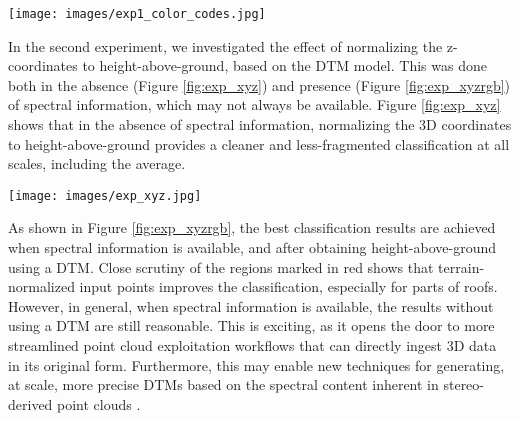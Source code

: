 \documentclass[final,3p,times,twocolumn,authoryear]{elsarticle}
\begin{document}
\begin{figure*}[th]
\begin{center}
\texttt{[image: images/exp1\_color\_codes.jpg]}
\end{center}
\caption{Results matrix showing the effect of training the network using different input features (rows), and at different block sizes (columns). The submitted result to the ISPRS 3D Semantic Labeling Contest is shown in the bottom right. Red markers indicate regions of comparison. Class color keys are shown at the bottom.}
\label{fig:exp1}
\end{figure*}

In the second experiment, we investigated the effect of normalizing the z-coordinates to height-above-ground, based on the DTM model. 
This was done both in the absence (Figure \ref{fig:exp_xyz}) and presence (Figure \ref{fig:exp_xyzrgb}) of spectral information, which may not always be available.  
Figure \ref{fig:exp_xyz} shows that in the absence of spectral information, normalizing the 3D coordinates to height-above-ground provides a cleaner and less-fragmented classification at all scales, including the average.

\begin{figure*}[th]
\begin{center}
\texttt{[image: images/exp\_xyz.jpg]}
\end{center}
\caption{A comparison between training with (bottom) and without (top) a digital terrain model using only 3D-coordinates for block sizes. }
\label{fig:exp_xyz}
\end{figure*}
As shown in Figure \ref{fig:exp_xyzrgb}, the best classification results are achieved when spectral information is available, and after obtaining height-above-ground using a DTM.
Close scrutiny of the regions marked in red shows that terrain-normalized input points improves the classification, especially for parts of roofs. 
However, in general, when spectral information is available, the results without using a DTM are still reasonable.
This is exciting, as it opens the door to more streamlined point cloud exploitation workflows that can directly ingest 3D data in its original form.
Furthermore, this may enable new techniques for generating, at scale, more precise DTMs based on the spectral content inherent in stereo-derived point clouds \citep{tapper2016extraction}. 
\end{document}
